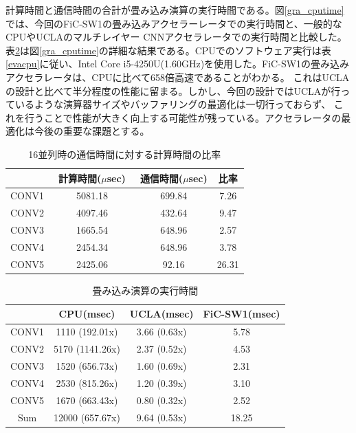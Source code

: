 計算時間と通信時間の合計が畳み込み演算の実行時間である。図\ref{gra_cputime}では、今回のFiC-SW1の畳み込みアクセラーレータでの実行時間と、一般的なCPUやUCLAのマルチレイヤー
CNNアクセラレータでの実行時間と比較した。表\ref{cputime}は図\ref{gra_cputime}の詳細な結果である。CPUでのソフトウェア実行は表\ref{evacpu}に従い、Intel Core i5-4250U(1.60GHz)を使用した。FiC-SW1の畳み込みアクセラレータは、CPUに比べて658倍高速であることがわかる。
これはUCLAの設計\cite{fpgaopt}と比べて半分程度の性能に留まる。しかし、今回の設計ではUCLAが行っているような演算器サイズやバッファリングの最適化は一切行っておらず、
これを行うことで性能が大きく向上する可能性が残っている。アクセラレータの最適化は今後の重要な課題とする。

\begin{table}[ht]
 \begin{center}
  \caption{16並列時の通信時間に対する計算時間の比率}
   \begin{tabular}{|c|c|c|c|} \hline
     &  計算時間($\mu$sec)　& 通信時間($\mu$sec) & 比率 \\ \hline
     CONV1 &  5081.18 & 699.84 & 7.26 \\
     CONV2 &  4097.46 & 432.64 &  9.47 \\
     CONV3 &  1665.54 & 648.96 &  2.57 \\
     CONV4 &  2454.34 & 648.96 &  3.78 \\
     CONV5 &  2425.06 & 92.16 &  26.31 \\ \hline
  \end{tabular}
  \label{timecomp}  
 \end{center}
\end{table}

\begin{table}[ht]
 \begin{center}
  \caption{畳み込み演算の実行時間}
   \begin{tabular}{|c|c|c|c|} \hline
     &  CPU(msec)　& UCLA\cite{fpgaopt}(msec) & FiC-SW1(msec) \\ \hline
     CONV1 & 1110 (192.01x) & 3.66 (0.63x) & 5.78 \\
     CONV2 & 5170 (1141.26x) & 2.37 (0.52x) & 4.53 \\
     CONV3 & 1520 (656.73x) & 1.60 (0.69x) & 2.31 \\
     CONV4 & 2530 (815.26x) & 1.20 (0.39x) & 3.10 \\
     CONV5 & 1670 (663.43x) & 0.80 (0.32x) & 2.52 \\ \hline
     Sum & 12000 (657.67x) & 9.64 (0.53x) & 18.25 \\ \hline
  \end{tabular}
  \label{cputime}  
 \end{center}
\end{table}

